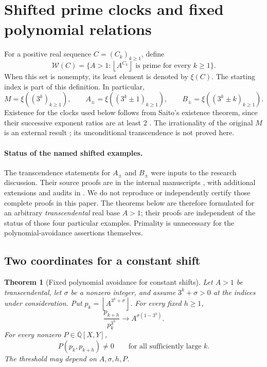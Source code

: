 \documentclass[11pt,a4paper]{article}
\numberwithin{equation}{section}
\newtheorem{theorem}{Theorem}[section]
\theoremstyle{definition}
\theoremstyle{remark}
\newcommand{\A}{\overline{\mathbb Q}}
\newcommand{\floor}[1]{\left\lfloor #1\right\rfloor}
\begin{document}
\section{Shifted prime clocks and fixed polynomial relations}
\label{mi:shifts}

For a positive real sequence \(C=(C_k)_{k\ge1}\), define
\[
 \mathcal W(C)=
 \{A>1:\floor{A^{C_k}}\text{ is prime for every }k\ge1\}.
\]
When this set is nonempty, its least element is denoted by \(\xi(C)\).
The starting index is part of this definition. In particular,
\[
 M=\xi((3^k)_{k\ge1}),\qquad
 A_\pm=\xi((3^k\pm1)_{k\ge1}),\qquad
 B_\pm=\xi((3^k\pm k)_{k\ge1}).
\]
Existence for the clocks used below follows from Saito's existence
theorem, since their successive exponent ratios are at least
\(2\) \cite[Theorem~1.3]{SaitoVariants}.
The irrationality of the original \(M\) is an external result
\cite{Saito2025}; its unconditional transcendence is not proved here.

\paragraph{Status of the named shifted examples.}
The transcendence statements for \(A_\pm\) and \(B_\pm\) were
inputs to the research discussion. Their source proofs are in the
internal manuscripts \cite{VMRC064,VMRC008}, with additional
extensions and audits in \cite{VMRC075}. We do not reproduce or
independently certify those complete proofs in this paper. The
theorems below are therefore formulated for an arbitrary
\emph{transcendental} real base \(A>1\); their proofs are independent
of the status of those four particular examples. Primality is
unnecessary for the polynomial-avoidance assertions themselves.

\subsection{Two coordinates for a constant shift}
\label{mi:two}

\begin{theorem}[Fixed polynomial avoidance for constant shifts]
\label{mi:affine}
Let \(A>1\) be transcendental, let \(\sigma\) be a nonzero integer,
and assume \(3^k+\sigma>0\) at the indices under consideration.
Put \(p_k=\floor{A^{3^k+\sigma}}\). For every fixed \(h\ge1\),
\[
 \frac{p_{k+h}}{p_k^{3^h}}
 \longrightarrow A^{\sigma(1-3^h)}.
\]
For every nonzero \(P\in\A[X,Y]\),
\[
 P(p_k,p_{k+h})\ne0
 \qquad\text{for all sufficiently large }k.
\]
The threshold may depend on \(A,\sigma,h,P\).
\end{theorem}
\end{document}
